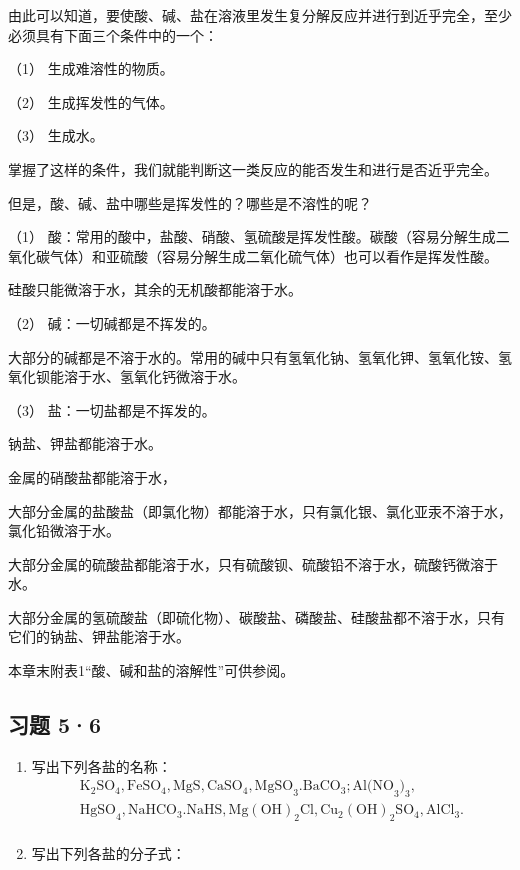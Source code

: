 由此可以知道，要使酸、碱、盐在溶液里发生复分解反应并进行到近乎完全，至少必须具有下面三个条件中的一个：

（1） 生成难溶性的物质。

（2） 生成挥发性的气体。

（3） 生成水。

掌握了这样的条件，我们就能判断这一类反应的能否发生和进行是否近乎完全。

但是，酸、碱、盐中哪些是挥发性的？哪些是不溶性的呢？

（1）
酸：常用的酸中，盐酸、硝酸、氢硫酸是挥发性酸。碳酸（容易分解生成二氧化碳气体）和亚硫酸（容易分解生成二氧化硫气体）也可以看作是挥发性酸。

硅酸只能微溶于水，其余的无机酸都能溶于水。

（2） 碱：一切碱都是不挥发的。

大部分的碱都是不溶于水的。常用的碱中只有氢氧化钠、氢氧化钾、氢氧化铵、氢氧化钡能溶于水、氢氧化钙微溶于水。

（3） 盐：一切盐都是不挥发的。

钠盐、钾盐都能溶于水。

金属的硝酸盐都能溶于水，

大部分金属的盐酸盐（即氯化物）都能溶于水，只有氯化银、氯化亚汞不溶于水，氯化铅微溶于水。

大部分金属的硫酸盐都能溶于水，只有硫酸钡、硫酸铅不溶于水，硫酸钙微溶于水。

大部分金属的氢硫酸盐（即硫化物）、碳酸盐、磷酸盐、硅酸盐都不溶于水，只有它们的钠盐、钾盐能溶于水。

本章末附表1``酸、碱和盐的溶解性''可供参阅。

\subsection{习题 5·6}

\begin{enumerate}
\item
  写出下列各盐的名称：
\[
\begin{array}{l} \mathrm{K}_{2} \mathrm{SO}_{4}, \mathrm{FeSO}_{4}, \mathrm{MgS}, \mathrm{CaSO}_{4}, \mathrm{MgSO}_{3}. \mathrm{BaCO}_{3}; \mathrm{Al(NO}_{3}\mathrm{)}_{3}, \\ \mathrm{HgSO}_{4}, \mathrm{NaHCO}_{3}. \mathrm{NaHS}, \mathrm{Mg(OH)}_{2} \mathrm{Cl}, \mathrm{Cu}_{2} (\mathrm{OH}) _ {2} \mathrm{SO}_{4}, \mathrm{AlCl}_{3}. \\ \end{array}
\]
\item
  写出下列各盐的分子式：
\end{enumerate}

